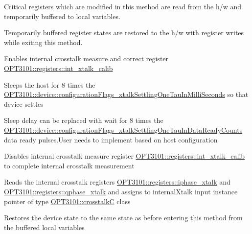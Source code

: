 \begin{DoxyItemize}
\item Critical registers which are modified in this method are read from the h/w and temporarily buffered to local variables.
\item Temporarily buffered register states are restored to the h/w with register writes while exiting this method.
\item Enables internal crosstalk measure and correct register \mbox{\hyperlink{class_o_p_t3101_1_1registers_a60e7f3df0ffecc327ff9c141797a523a}{O\+P\+T3101\+::registers\+::int\+\_\+xtalk\+\_\+calib}}
\item Sleeps the host for 8 times the \mbox{\hyperlink{class_o_p_t3101_1_1device_a9c579bc94d5a43a464129f5b67314eac}{O\+P\+T3101\+::device\+::configuration\+Flags\+\_\+xtalk\+Settling\+One\+Tau\+In\+Milli\+Seconds}} so that device settles
\item Sleep delay can be replaced with wait for 8 times the \mbox{\hyperlink{class_o_p_t3101_1_1device_acc3387f448c10f642260a031c5d0a11d}{O\+P\+T3101\+::device\+::configuration\+Flags\+\_\+xtalk\+Settling\+One\+Tau\+In\+Data\+Ready\+Counts}} data ready pulses.\+User needs to implement based on host configuration
\item Disables internal crosstalk measure register \mbox{\hyperlink{class_o_p_t3101_1_1registers_a60e7f3df0ffecc327ff9c141797a523a}{O\+P\+T3101\+::registers\+::int\+\_\+xtalk\+\_\+calib}} to complete internal crosstalk measurement
\item Reads the internal crosstalk registers \mbox{\hyperlink{class_o_p_t3101_1_1registers_ae87864da6c35bed7c34ebf5f26ba4513}{O\+P\+T3101\+::registers\+::iphase\+\_\+xtalk}} and \mbox{\hyperlink{class_o_p_t3101_1_1registers_ad94d98dfb26313a9d32c5c2c0c673693}{O\+P\+T3101\+::registers\+::qphase\+\_\+xtalk}} and assigns to internal\+Xtalk input instance pointer of type \mbox{\hyperlink{class_o_p_t3101_1_1crosstalk_c}{O\+P\+T3101\+::crosstalkC}} class
\item Restores the device state to the same state as before entering this method from the buffered local variables 
\end{DoxyItemize}\mbox{\label{class_o_p_t3101_1_1device_a839d95aec303413e322382ff9e2228d4}} 
